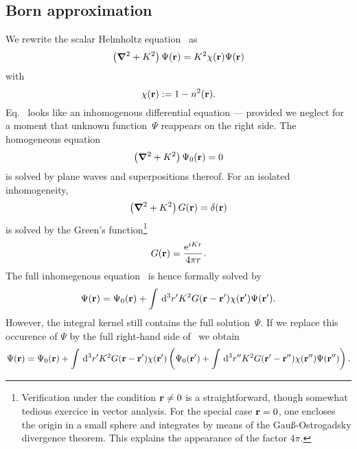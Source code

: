\subsection{Born approximation}

We rewrite the scalar Helmholtz equation~ as
\begin{equation}\label{eq:HelmholtzInhomog}
  \left(\bm{\nabla}^2+K^2\right)\Psi(\mathbf{r}) = K^2\chi(\mathbf{r})\Psi(\mathbf{r})
\end{equation}
with
\begin{equation}
  \chi(\mathbf{r}) := 1-n^2(\mathbf{r}).
\end{equation}
Eq.~ looks like an inhomogenous differential equation ---
provided we neglect for a moment that unknown function~$\Psi$
reappears on the right side.
The homogeneous equation
\begin{equation}\label{eq:HelmholtzHomog}
  \left(\bm{\nabla}^2+K^2\right)\Psi_0(\mathbf{r}) = 0
\end{equation}
is solved by plane waves and superpositions thereof.
For an isolated inhomogeneity,
\begin{equation}\label{eq:HelmholtzInhomog}
  \left(\bm{\nabla}^2+K^2\right)G(\mathbf{r}) = \delta(\mathbf{r})
\end{equation}
is solved by the Green's function\footnote
{Verification under the condition $\mathbf{r}\ne0$
is a straightforward, though somewhat tedious exercice in vector analysis.
For the special case $\mathbf{r}=0$,
one encloses the origin in a small sphere
and integrates by means of the Gauß-Ostrogadsky divergence theorem.
This explains the appearance of the factor $4\pi$.}
\begin{equation}\label{eq:Greens1}
  G(\mathbf{r}) = \frac{{\rm e}^{iKr}}{4\pi r}.
\end{equation}
The full inhomegenous equation~ is hence
formally solved by
\begin{equation}\label{eq:PsiFormal}
  \Psi(\mathbf{r})
  = \Psi_0(\mathbf{r})
    + \int\,{\rm d}^3r' K^2G(\mathbf{r}-\mathbf{r'})\chi(\mathbf{r'})\Psi(\mathbf{r'}).
\end{equation}
However, the integral kernel still contains the full solution~$\Psi$.
If we replace this occurence of $\Psi$
by the full right-hand side of~
we obtain
\begin{equation}
  \Psi(\mathbf{r})
  = \Psi_0(\mathbf{r})
  + \int\,{\rm d}^3r' K^2G(\mathbf{r}-\mathbf{r'})\chi(\mathbf{r'})
  \left(\Psi_0(\mathbf{r'})
  + \int\,{\rm d}^3r''
     K^2G(\mathbf{r'}-\mathbf{r''})\chi(\mathbf{r''})\Psi(\mathbf{r''})\right).
\end{equation}
